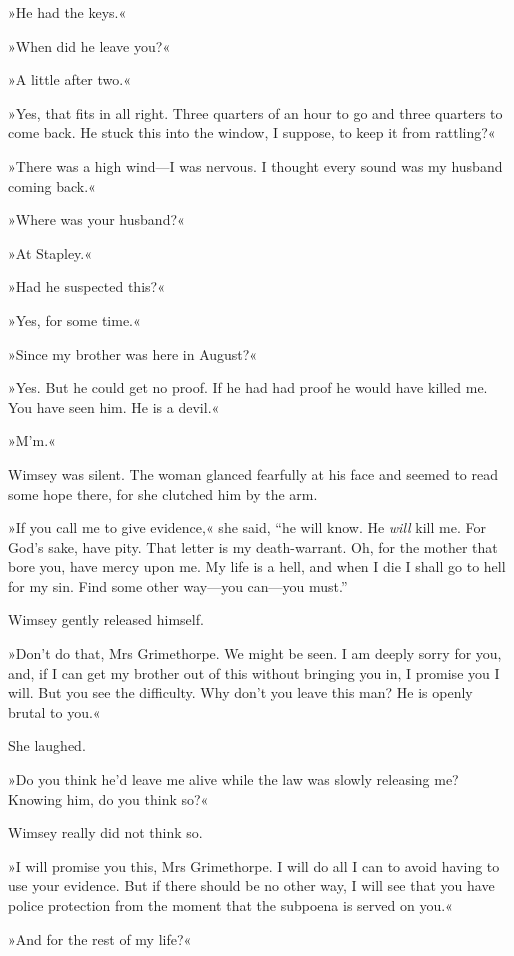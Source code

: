 »He had the keys.«

»When did he leave you?«

»A little after two.«

»Yes, that fits in all right. Three quarters of an hour to go and three quarters to come back. He stuck this into the window, I suppose, to keep it from rattling?«

»There was a high wind\allowbreak---\allowbreak I was nervous. I thought every sound was my husband coming back.«

»Where was your husband?«

»At Stapley.«

»Had he suspected this?«

»Yes, for some time.«

»Since my brother was here in August?«

»Yes. But he could get no proof. If he had had proof he would have killed me. You have seen him. He is a devil.«

»M'm.«

Wimsey was silent. The woman glanced fearfully at his face and seemed to read some hope there, for she clutched him by the arm.

»If you call me to give evidence,« she said, \enquote{he will know. He \textit{will} kill me. For God's sake, have pity. That letter is my death-warrant.  Oh, for the mother that bore you, have mercy upon me. My life is a hell, and when I die I shall go to hell for my sin. Find some other way\allowbreak---\allowbreak you can\allowbreak---\allowbreak you must.}

Wimsey gently released himself.

»Don't do that, Mrs Grimethorpe. We might be seen. I am deeply sorry for you, and, if I can get my brother out of this without bringing you in, I promise you I will. But you see the difficulty. Why don't you leave this man? He is openly brutal to you.«

She laughed.

»Do you think he'd leave me alive while the law was slowly releasing me? Knowing him, do you think so?«

Wimsey really did not think so.

»I will promise you this, Mrs Grimethorpe. I will do all I can to avoid having to use your evidence. But if there should be no other way, I will see that you have police protection from the moment that the subpoena is served on you.«

»And for the rest of my life?«

